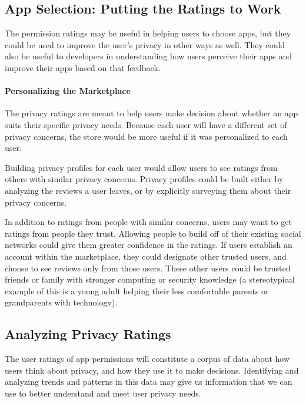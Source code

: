 \documentclass[11pt]{article}
\begin{document}
\subsection{App Selection: Putting the Ratings to Work}
\label{subsec-app-selection}

The permission ratings may be useful in helping users to choose apps, but
they could be used to improve the user's privacy in other ways as well. They could
also be useful to developers in understanding how users perceive their apps 
and improve their apps based on that feedback.

\paragraph{Personalizing the Marketplace}
\label{subsubsec-personalizing}

The privacy ratings are meant to help users make decision about whether
an app suits their specific privacy needs. Because each user will have a different
set of privacy concerns, the store would be more useful if it was personalized
to each user.

Building privacy profiles for each user would allow users to see ratings from
others with similar privacy concerns. Privacy profiles could be built either by 
analyzing the reviews a user leaves, or by explicitly surveying them about their
privacy concerns. 

In addition to ratings from people with similar concerns, users may want to get
ratings from people they trust. Allowing people to build off of their existing 
social networks could give them greater confidence in the ratings. If users 
establish an account within the marketplace, they could designate other trusted
users, and choose to see reviews only from those users.
These other users could be trusted friends or family with stronger
computing or security knowledge (a stereotypical example of this is a
young adult helping their less comfortable parents or grandparents with technology).

\subsection{Analyzing Privacy Ratings}
\label{subsec-analyzing-ratings}

The user ratings of app permissions will constitute a corpus of 
data about how users think about privacy, and how they use it to make decisions.
Identifying and analyzing trends and patterns in this data may give us 
information that we can use to better understand and meet user privacy needs.
\end{document}
